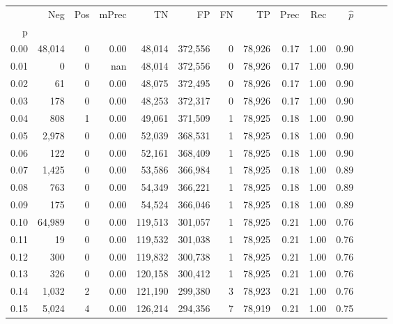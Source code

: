 \begin{tabular}{rrrrrrrrrrrrrr}
\toprule
{} &     Neg &     Pos & mPrec &       TN &       FP &      FN &      TP &  Prec &   Rec & $\hat{p}$ \\
p    &         &         &       &          &          &         &         &       &       &           \\
\midrule
0.00 &  48,014 &       0 &  0.00 &   48,014 &  372,556 &       0 &  78,926 &  0.17 &  1.00 &      0.90 \\
0.01 &       0 &       0 &   nan &   48,014 &  372,556 &       0 &  78,926 &  0.17 &  1.00 &      0.90 \\
0.02 &      61 &       0 &  0.00 &   48,075 &  372,495 &       0 &  78,926 &  0.17 &  1.00 &      0.90 \\
0.03 &     178 &       0 &  0.00 &   48,253 &  372,317 &       0 &  78,926 &  0.17 &  1.00 &      0.90 \\
0.04 &     808 &       1 &  0.00 &   49,061 &  371,509 &       1 &  78,925 &  0.18 &  1.00 &      0.90 \\
0.05 &   2,978 &       0 &  0.00 &   52,039 &  368,531 &       1 &  78,925 &  0.18 &  1.00 &      0.90 \\
0.06 &     122 &       0 &  0.00 &   52,161 &  368,409 &       1 &  78,925 &  0.18 &  1.00 &      0.90 \\
0.07 &   1,425 &       0 &  0.00 &   53,586 &  366,984 &       1 &  78,925 &  0.18 &  1.00 &      0.89 \\
0.08 &     763 &       0 &  0.00 &   54,349 &  366,221 &       1 &  78,925 &  0.18 &  1.00 &      0.89 \\
0.09 &     175 &       0 &  0.00 &   54,524 &  366,046 &       1 &  78,925 &  0.18 &  1.00 &      0.89 \\
0.10 &  64,989 &       0 &  0.00 &  119,513 &  301,057 &       1 &  78,925 &  0.21 &  1.00 &      0.76 \\
0.11 &      19 &       0 &  0.00 &  119,532 &  301,038 &       1 &  78,925 &  0.21 &  1.00 &      0.76 \\
0.12 &     300 &       0 &  0.00 &  119,832 &  300,738 &       1 &  78,925 &  0.21 &  1.00 &      0.76 \\
0.13 &     326 &       0 &  0.00 &  120,158 &  300,412 &       1 &  78,925 &  0.21 &  1.00 &      0.76 \\
0.14 &   1,032 &       2 &  0.00 &  121,190 &  299,380 &       3 &  78,923 &  0.21 &  1.00 &      0.76 \\
0.15 &   5,024 &       4 &  0.00 &  126,214 &  294,356 &       7 &  78,919 &  0.21 &  1.00 &      0.75 \\

\end{tabular}
